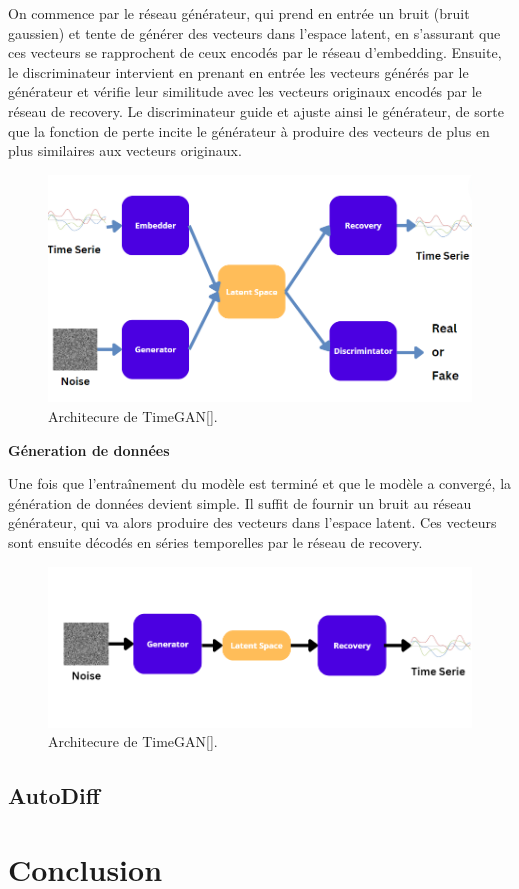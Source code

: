 On commence par le réseau générateur, qui prend en entrée un bruit (bruit
gaussien) et tente de générer des vecteurs dans l'espace latent, en s'assurant
que ces vecteurs se rapprochent de ceux encodés par le réseau d'embedding.
Ensuite, le discriminateur intervient en prenant en entrée les vecteurs générés
par le générateur et vérifie leur similitude avec les vecteurs originaux
encodés par le réseau de recovery. Le discriminateur guide et ajuste ainsi le
générateur, de sorte que la fonction de perte incite le générateur à produire
des vecteurs de plus en plus similaires aux vecteurs originaux.

\begin{figure}[hbt!]
  \centering
  \includegraphics[width=14cm]{images_pfe/timegan_archi_.png}
  \caption{Architecure de TimeGAN[\cite{yoon2019time}].}
  \label{fig:timegan}
\end{figure}
\FloatBarrier

\textbf{Géneration de données}

Une fois que l'entraînement du modèle est terminé et que le modèle a convergé,
la génération de données devient simple. Il suffit de fournir un bruit au
réseau générateur, qui va alors produire des vecteurs dans l'espace latent. Ces
vecteurs sont ensuite décodés en séries temporelles par le réseau de recovery.

\begin{figure}[hbt!]
  \centering
  \includegraphics[width=14cm]{images_pfe/gents.png}
  \caption{Architecure de TimeGAN[\cite{yoon2019time}].}
  \label{fig:timegan}
\end{figure}
\FloatBarrier

\subsection{AutoDiff}

\section{Conclusion}